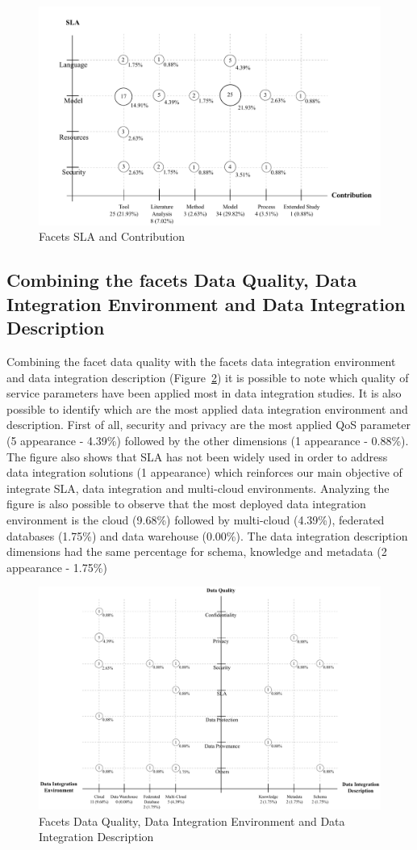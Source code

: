 \begin{figure}[h!]
\centering
\includegraphics[scale=0.65]{figs/bubble-charts/SLA-Contribution.pdf}
\caption{Facets SLA and Contribution}\label{fig:facet3}
\end{figure}


\subsection{Combining the facets Data Quality, Data Integration Environment and Data Integration Description}

Combining the facet data quality with the facets data integration environment and data integration description
(Figure~\ref{fig:facet4}) it is possible to note which quality of service parameters have been applied most in
data integration studies.
It is also possible to identify which are the most applied data integration environment and description.
First of all, security and privacy are the most applied QoS parameter (5 appearance - 4.39\%)
followed by the other dimensions (1 appearance - 0.88\%). 
The figure also shows that SLA has not been widely used in order to address data integration solutions
(1 appearance) which reinforces our main objective of integrate SLA, data integration and multi-cloud 
environments. 
Analyzing the figure is also possible to observe that the most deployed data integration environment is 
the cloud (9.68\%) followed by multi-cloud (4.39\%), federated databases (1.75\%) and data warehouse (0.00\%).
The data integration description dimensions had the same percentage for schema, knowledge and metadata (2 appearance - 1.75\%)

\begin{figure}[!h]
\centering
\includegraphics[scale=0.53]{figs/bubble-charts/Data-Quality-DI.pdf}
\caption{Facets Data Quality, Data Integration Environment and Data Integration Description}\label{fig:facet4}
\end{figure}
